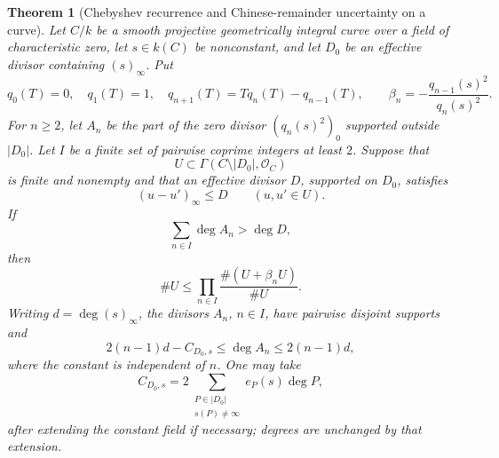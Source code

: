 \documentclass[11pt,reqno]{amsart}
\newtheorem{theorem}{Theorem}[section]
\theoremstyle{definition}
\theoremstyle{remark}
\begin{document}
\begin{theorem}[Chebyshev recurrence and Chinese-remainder uncertainty on a curve]
\label{thm:chebyshev-crt-curve}
Let \(C/k\) be a smooth projective geometrically integral curve over a
field of characteristic zero, let \(s\in k(C)\) be nonconstant, and let
\(D_0\) be an effective divisor containing \((s)_\infty\).  Put
\[
 q_0(T)=0,\quad q_1(T)=1,\quad
 q_{n+1}(T)=Tq_n(T)-q_{n-1}(T),\qquad
 \beta_n=-\frac{q_{n-1}(s)^2}{q_n(s)^2}.
\]
For \(n\ge2\), let \(A_n\) be the part of the zero divisor
\((q_n(s)^2)_0\) supported outside \(|D_0|\).  Let \(I\) be a finite set
of pairwise coprime integers at least \(2\).  Suppose that
\[
 U\subset\Gamma(C\setminus|D_0|,\mathcal O_C)
\]
is finite and nonempty and that an effective divisor \(D\), supported on
\(D_0\),
satisfies
\[
 (u-u')_\infty\le D\qquad(u,u'\in U).
\tag{13.10bh1}
\]
If
\[
 \sum_{n\in I}\deg A_n>\deg D,
\tag{13.10bh2}
\]
then
\[
 \#U\le
 \prod_{n\in I}\frac{\#(U+\beta_nU)}{\#U}.
\tag{13.10bh3}
\]
Writing \(d=\deg(s)_\infty\), the divisors \(A_n\), \(n\in I\), have
pairwise disjoint supports and
\[
 2(n-1)d-C_{D_0,s}\le\deg A_n\le2(n-1)d,
\tag{13.10bh4}
\]
where the constant is independent of \(n\).  One may take
\[
 C_{D_0,s}
 =2\sum_{\substack{P\in|D_0|\\s(P)\ne\infty}}
 e_P(s)\deg P,
\]
after extending the constant field if necessary; degrees are unchanged by
that extension.
\end{theorem}
\end{document}
